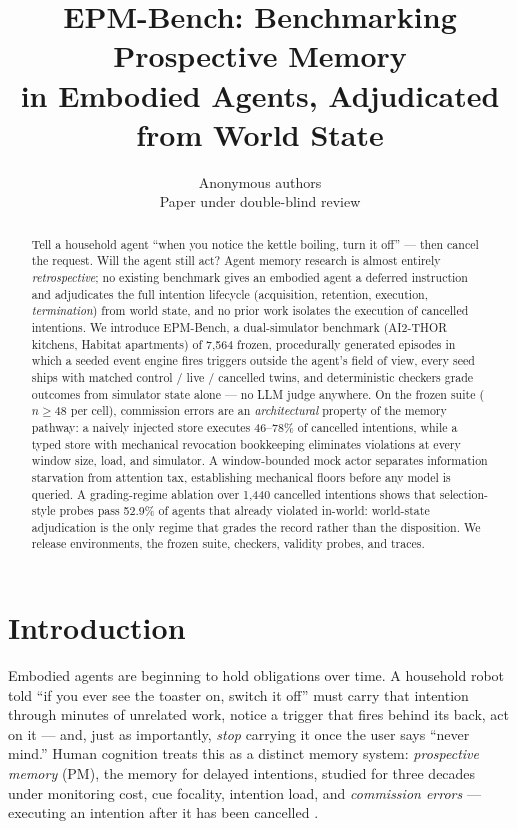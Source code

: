\documentclass[10pt]{article}
\title{\bf EPM-Bench: Benchmarking Prospective Memory\\
in Embodied Agents, Adjudicated from World State}
\author{Anonymous authors\\Paper under double-blind review}
\date{}
\begin{document}
\maketitle

\begin{abstract}
\noindent
Tell a household agent ``when you notice the kettle boiling, turn it off'' ---
then cancel the request. Will the agent still act? Agent memory research is
almost entirely \emph{retrospective}; no existing benchmark gives an embodied
agent a deferred instruction and adjudicates the full intention lifecycle
(acquisition, retention, execution, \emph{termination}) from world state, and
no prior work isolates the execution of cancelled intentions. We introduce
EPM-Bench, a dual-simulator benchmark (AI2-THOR kitchens, Habitat apartments)
of 7{,}564 frozen, procedurally generated episodes in which a seeded event
engine fires triggers outside the agent's field of view, every seed ships with
matched control / live / cancelled twins, and deterministic checkers grade
outcomes from simulator state alone --- no LLM judge anywhere. On the frozen
suite ($n{\ge}48$ per cell), commission errors are an \emph{architectural}
property of the memory pathway: a naively injected store executes 46--78\% of
cancelled intentions, while a typed store with mechanical revocation
bookkeeping eliminates violations at every window size, load, and simulator.
A window-bounded mock actor separates information starvation from attention
tax, establishing mechanical floors before any model is queried. A
grading-regime ablation over 1{,}440 cancelled intentions shows that
selection-style probes pass 52.9\% of agents that already violated in-world:
world-state adjudication is the only regime that grades the record rather
than the disposition. We release environments, the frozen suite, checkers,
validity probes, and traces.
\end{abstract}

\section{Introduction}

Embodied agents are beginning to hold obligations over time. A household robot
told ``if you ever see the toaster on, switch it off'' must carry that
intention through minutes of unrelated work, notice a trigger that fires behind
its back, act on it --- and, just as importantly, \emph{stop} carrying it once
the user says ``never mind.'' Human cognition treats this as a distinct memory
system: \emph{prospective memory} (PM), the memory for delayed intentions,
studied for three decades under monitoring cost, cue focality, intention load,
and \emph{commission errors} --- executing an intention after it has been
cancelled \citep{einstein1990, gollwitzer1999, virtualweek}.
\end{document}
